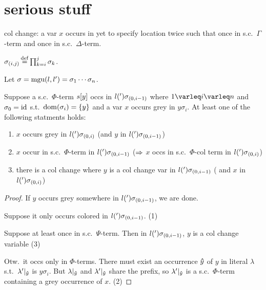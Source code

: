\documentclass[,%
	paper=a4,%
	DIV11, %
	twoside=false,%
	liststotoc,
	bibtotoc,
	draft=false,%
	numbers=noendperiod
]{scrartcl}
\begin{document}
\section{serious stuff}

\begin{defi}
	col change: a var $x$ occurs in yet to specify location twice such that once in s.c.\ $\Gamma$-term and once in s.c.\ $\Delta$-term.
\end{defi}

\newcommand{\epsilondelta}{\varepsilon\occ\delta}
\newcommand{\epsilonx}{\varepsilon\occ x}
\newcommand{\epsilony}{\varepsilon\occ y}
\newcommand{\epsilonz}{\varepsilon\occ z}


\begin{defi}
	$\sigma_{(i,j)} \operatorname{\stackrel{\mathrm{def}}{=}} \prod_{k=i}^j\sigma_k$.
\end{defi}

\begin{lemma}
	\label{new_25}
	Let $\sigma = \operatorname{mgu}(l, l') = \sigma_1 \cdots \sigma_n$.

	Suppose a s.c.\ $\Phi$-term $s[y]$ occs in $l(')\sigma_{(0,i-1)}$ where $1\varleq i \varleq n$ and $\sigma_0 = \operatorname{id}$ s.t.\ $\operatorname{dom}(\sigma_i) = \{y\}$ and a var $x$ occurs grey in $y\sigma_i$.
	At least one of the following statments holds:

	\begin{enumerate}
		\item $x$ occurs grey in $l(')\sigma_{(0,i)}$ (and $y$ in $l(')\sigma_{(0,i-1)}$)
		\item $x$ occur in s.c.\ $\Phi$-term in $l(')\sigma_{(0,i-1)}$  
			($\Rightarrow$ $x$ occs in s.c.\ $\Phi$-col term in $l(')\sigma_{(0,i)}$)
		\item there is a col change where $y$ is a col change var in $l(')\sigma_{(0,i-1)}$ ( and $x$ in $l(')\sigma_{(0,i)}$) 
	\end{enumerate}
\end{lemma}
\begin{proof}
	If $y$ occurs grey somewhere in $l(')\sigma_{(0,i-1)}$, we are done.

	Suppose it only occurs colored in $l(')\sigma_{(0,i-1)}$. (1)

	Suppose at least once in s.c.\ $\Psi$-term.
	Then in $l(')\sigma_{(0,i-1)}$, $y$ is a col change variable (3)

	Otw.\ it occs only in $\Phi$-terms. 
	There must exist an occurrence $\bm\hat y$ of $y$ in literal $\lambda$ s.t.\ $\lambda'|_{\bm\hat y}$ is $y\sigma_i$.
But $\lambda|_{\bm\hat y}$ and $\lambda'|_{\bm\hat y}$ share the prefix, so $\lambda'|_{\bm\hat y}$ is a s.c.\ $\Phi$-term containing a grey occurrence of $x$. (2)
\end{proof}
\end{document}
